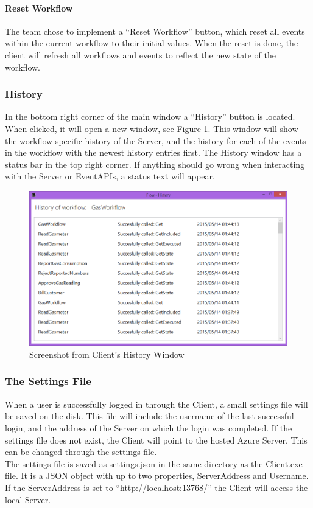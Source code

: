 \paragraph{Reset Workflow}
The team chose to implement a “Reset Workflow” button, which reset all events within the current workflow to their initial values. When the reset is done, the client will refresh all workflows and events to reflect the new state of the workflow.


\subsubsection{History}
In the bottom right corner of the main window a “History” button is located. When clicked, it will open a new window, see Figure \ref{fig:HistoryClient}. \newline
This window will show the workflow specific history of the Server, and the history for each of the events in the workflow with the newest history entries first. \newline
The History window has a status bar in the top right corner. If anything should go wrong when interacting with the Server or EventAPIs, a status text will appear.

\begin{figure}[h!]
\centering
\includegraphics[width=\linewidth]{Figures/HistoryWindow}
\caption{\label{fig:HistoryClient}Screenshot from Client's History Window}
\end{figure}


\subsubsection{The Settings File \label{sec:SettingsFile}}
When a user is successfully logged in through the Client, a small settings file will be saved on the disk. This file will include the username of the last successful login, and the address of the Server on which the login was completed. If the settings file does not exist, the Client will point to the hosted Azure Server. This can be changed through the settings file. \\
The settings file is saved as settings.json in the same directory as the Client.exe file. It is a JSON object with up to two properties, ServerAddress and Username. If the ServerAddress is set to “http://localhost:13768/” the Client will access the local Server.